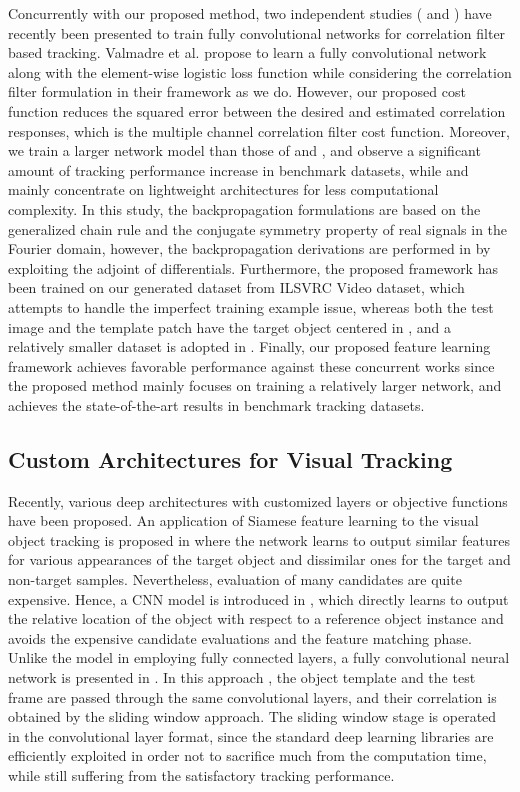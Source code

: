 \documentclass[journal]{IEEEtran}
\begin{document}
Concurrently with our proposed method, two independent studies (\cite{CFNet} and \cite{DCFNet}) have recently been presented to train fully convolutional networks for correlation filter based tracking. Valmadre et al. \cite{CFNet} propose to learn a fully convolutional network along with the element-wise logistic loss function while considering the correlation filter formulation in their framework as we do. However, our proposed cost function reduces the squared error between the desired and estimated correlation responses, which is the multiple channel correlation filter cost function. Moreover, we train a larger network model than those of \cite{CFNet} and \cite{DCFNet}, and observe a significant amount of tracking performance increase in benchmark datasets, while \cite{CFNet} and \cite{DCFNet} mainly concentrate on lightweight architectures for less computational complexity. In this study, the backpropagation formulations are based on the generalized chain rule and the conjugate symmetry property of real signals in the Fourier domain, however, the backpropagation derivations are performed in \cite{CFNet} by exploiting the adjoint of differentials. Furthermore, the proposed framework has been trained on our generated dataset from ILSVRC Video dataset, which attempts to handle the imperfect training example issue, whereas both the test image and the template patch have the target object centered in \cite{CFNet}, and a relatively smaller dataset is adopted in \cite{DCFNet}. Finally, our proposed feature learning framework achieves favorable performance against these concurrent works since the proposed method mainly focuses on training a relatively larger network, and achieves the state-of-the-art results in benchmark tracking datasets.

\subsection{Custom Architectures for Visual Tracking}
Recently, various deep architectures with customized layers or objective functions have been proposed. An application of Siamese feature learning to the visual object tracking is proposed in \cite{SINT} where the network learns to output similar features for various appearances of the target object and dissimilar ones for the target and non-target samples. Nevertheless, evaluation of many candidates are quite expensive. Hence, a CNN model is introduced in \cite{GoTurn}, which directly learns to output the relative location of the object with respect to a reference object instance and avoids the expensive candidate evaluations and the feature matching phase. Unlike the model in \cite{GoTurn} employing fully connected layers, a fully convolutional neural network is presented in \cite{SiamFC}. In this approach \cite{SiamFC}, the object template and the test frame are passed through the same convolutional layers, and their correlation is obtained by the sliding window approach. The sliding window stage is operated in the convolutional layer format, since the standard deep learning libraries are efficiently exploited in order not to sacrifice much from the computation time, while still suffering from the satisfactory tracking performance.
\end{document}
